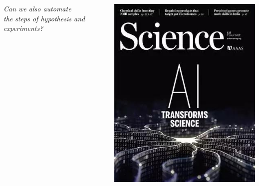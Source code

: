 \documentclass{beamer}
\begin{document}
\begin{frame}
    \begin{columns}
        \begin{column}{0.7\textwidth}
            \begin{center}
                \it Can we also automate \\
                    the steps of hypothesis and experiments?
            \end{center}
        \end{column}
        \begin{column}{0.25\textwidth}
            \begin{center}
                \includegraphics[width=\textwidth]{figures/cover.png}
            \end{center}
        \end{column}
    \end{columns}
\end{frame}
\end{document}
